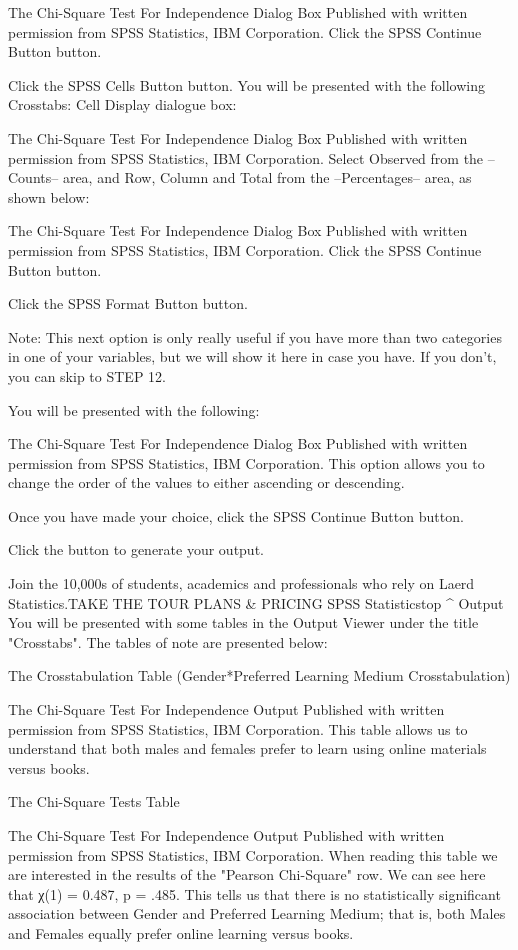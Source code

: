 The Chi-Square Test For Independence Dialog Box
Published with written permission from SPSS Statistics, IBM Corporation.
Click the SPSS Continue Button button.

Click the SPSS Cells Button button. You will be presented with the following Crosstabs: Cell Display dialogue box:

The Chi-Square Test For Independence Dialog Box
Published with written permission from SPSS Statistics, IBM Corporation.
Select Observed from the –Counts– area, and Row, Column and Total from the –Percentages– area, as shown below:

The Chi-Square Test For Independence Dialog Box
Published with written permission from SPSS Statistics, IBM Corporation.
Click the SPSS Continue Button button.

Click the SPSS Format Button button.

Note: This next option is only really useful if you have more than two categories in one of your variables, but we will show it here in case you have. If you don't, you can skip to STEP 12.

You will be presented with the following:

The Chi-Square Test For Independence Dialog Box
Published with written permission from SPSS Statistics, IBM Corporation.
This option allows you to change the order of the values to either ascending or descending.

Once you have made your choice, click the SPSS Continue Button button.

Click the  button to generate your output.

Join the 10,000s of students, academics and professionals who rely on Laerd Statistics.TAKE THE TOUR PLANS & PRICING
SPSS Statisticstop ^
Output
You will be presented with some tables in the Output Viewer under the title "Crosstabs". The tables of note are presented below:

The Crosstabulation Table (Gender*Preferred Learning Medium Crosstabulation)

The Chi-Square Test For Independence Output
Published with written permission from SPSS Statistics, IBM Corporation.
This table allows us to understand that both males and females prefer to learn using online materials versus books.

The Chi-Square Tests Table

The Chi-Square Test For Independence Output
Published with written permission from SPSS Statistics, IBM Corporation.
When reading this table we are interested in the results of the "Pearson Chi-Square" row. We can see here that χ(1) = 0.487, p = .485. This tells us that there is no statistically significant association between Gender and Preferred Learning Medium; that is, both Males and Females equally prefer online learning versus books.

